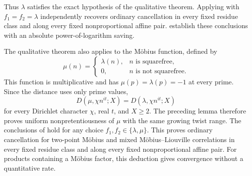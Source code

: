 Thus $\lambda$ satisfies the exact hypothesis of the qualitative theorem.
Applying  with
$f_1=f_2=\lambda$ independently recovers ordinary cancellation in
every fixed residue class and along every fixed nonproportional affine
pair.  establish these conclusions
with an absolute power-of-logarithm saving.

The qualitative theorem also applies to the M\"obius function, defined by
\[
 \mu(n)=
 \begin{cases}
 \lambda(n),&n\text{ is squarefree},\\
 0,&n\text{ is not squarefree}.
 \end{cases}
\]
This function is multiplicative and has $\mu(p)=\lambda(p)=-1$ at
every prime. Since the distance uses only prime values,
\[
 D(\mu,\chi n^{it};X)=D(\lambda,\chi n^{it};X)
\]
for every Dirichlet character $\chi$, real $t$, and $X\ge2$.
The preceding lemma therefore proves uniform nonpretentiousness of
$\mu$ with the same growing twist range. The conclusions of
 hold for any choice
$f_1,f_2\in\{\lambda,\mu\}$. This proves ordinary cancellation for two-point M\"obius
and mixed M\"obius--Liouville correlations in every fixed
residue class and along every fixed nonproportional affine pair.
For products containing a M\"obius factor, this deduction gives
convergence without a quantitative rate.
